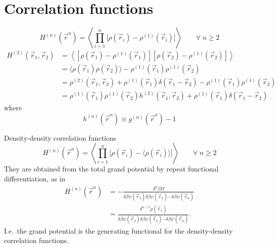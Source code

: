 \section{Correlation functions}

\begin{equation}
  H^{(n)}(\vec{r}^n) =
  \left\langle
  \prod_{i=1}^n
  \Big[ \rho(\vec{r}_i) - \rho^{(1)}(\vec{r}_i) \Big]
  \right\rangle
  \qquad \forall \; n \ge 2
\end{equation}
\begin{equation}
  \begin{aligned}
    H^{(2)}(\vec{r}_1, \vec{r}_2) &=
    \left\langle
    \left[ \rho(\vec{r}_1) - \rho^{(1)}(\vec{r}_1) \right]
    \left[ \rho(\vec{r}_2) - \rho^{(1)}(\vec{r}_2) \right]
    \right\rangle \\
    &=
    \big\langle \rho(\vec{r}_1) \rho(\vec{r}_2) \big\rangle -
    \rho^{(1)}(\vec{r}_1) \rho^{(1)}(\vec{r}_2) \\
    &=
    \rho^{(2)}(\vec{r}_1, \vec{r}_2) +
    \rho^{(1)}(\vec{r}_1) \delta(\vec{r}_1 - \vec{r}_2) -
    \rho^{(1)}(\vec{r}_1) \rho^{(1)}(\vec{r}_2) \\
    &=
    \rho^{(1)}(\vec{r}_1) \rho^{(1)}(\vec{r}_2) h^{(2)}(\vec{r}_1, \vec{r}_2)
    +
    \rho^{(1)}(\vec{r}_1) \delta(\vec{r}_1 - \vec{r}_2)
  \end{aligned}
\end{equation}
where
\begin{equation}
  h^{(n)}(\vec{r}^n) \equiv g^{(n)}(\vec{r}^n) - 1
\end{equation}

Density-density correlation functions
\begin{equation}
  H^{(n)}(\vec{r}^n) =
  \left\langle
  \prod_{i=1}^n
  \Big[ \rho(\vec{r}_i) - \big\langle\rho(\vec{r}_i)\big\rangle \Big]
  \right\rangle
  \qquad \forall \; n \ge 2
\end{equation}
They are obtained from the total grand potential by repeat functional differentiation, as in
\begin{equation}
  \begin{aligned}
  H^{(n)}(\vec{r}^n) &=
  - \frac{\delta^n \beta \Omega}{\delta \beta\psi(\vec{r}_1) \delta \beta\psi(\vec{r}_2) \cdots \delta \beta\psi(\vec{r}_n)} \\
  &=
  \frac{\delta^{n-1} \rho(\vec{r}_1)}{\delta \beta\psi(\vec{r}_2) \delta \beta\psi(\vec{r}_3) \cdots \delta \beta\psi(\vec{r}_n)}.
  \end{aligned}
\end{equation}
I.e.\ the grand potential is the generating functional for the density-density correlation functions.

